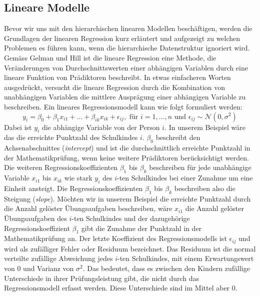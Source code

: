 \documentclass[12pt]{article}\usepackage[]{graphicx}\usepackage[]{color}
\numberwithin{equation}{section}
\begin{document}
\subsection{Lineare Modelle} \label{section:linear_model}
Bevor wir uns mit den hierarchischen linearen Modellen beschäftigen, werden die Grundlagen der linearen Regression kurz erläutert und aufgezeigt zu welchen Problemen es führen kann, wenn die hierarchische Datenstruktur ignoriert wird. Gemäss Gelman und Hill \citeyearpar{andrew_data} ist die lineare Regression eine Methode, die Veränderungen von Durchschnittswerten einer abhängigen Variablen durch eine lineare Funktion von Prädiktoren beschreibt. In etwas einfacheren Worten ausgedrückt, versucht die lineare Regression durch die Kombination von unabhängigen Variablen die mittlere Ausprägung einer abhängigen Variable zu beschreiben. Ein lineares Regressionsmodell kann wie folgt formuliert werden:
\begin{equation} \label{eq:ols_model}
y_{i} = \beta_{0} + \beta_{1}x_{i1} + \dots + \beta_{ik}x_{ik} + \epsilon_{ij}, \text{ für } i = 1, \dots, n \text{ und } \epsilon_{ij} \sim \mathcal{N}(0,\sigma^{2})
\end{equation}
Dabei ist $y_{i}$ die abhängige Variable von der Person $i$. In unserem Beispiel wäre das die erreichte Punktzahl des Schulkindes $i$. $\beta_0$ beschreibt den Achsenabschnittes (\textit{intercept}) und ist die durchschnittlich erreichte Punktzahl in der Mathematikprüfung, wenn keine weitere Prädiktoren berücksichtigt werden. Die weiteren Regressionskoeffizienten $\beta_{1}$ bis $\beta_{k}$ beschreiben für jede unabhängige Variable $x_{i1}$ bis $x_{ik}$ wie stark $y_{i}$ des $i$-ten Schulkindes bei einer Zunahme um eine Einheit ansteigt. Die Regressionskoeffizienten $\beta_{1}$ bis $\beta_{k}$ beschreiben also die Steigung (\textit{slope}). Möchten wir in unserem Beispiel die erreichte Punktzahl durch die Anzahl gelöster Übungsaufgaben beschreiben, wäre $x_{i1}$ die Anzahl gelöster Übungsaufgaben des $i$-ten Schulkindes und der dazugehörige Regressionskoeffizient $\beta_{1}$ gibt die Zunahme der Punktzahl in der Mathematikprüfung an. Der letzte Koeffizient des Regressionsmodells ist $\epsilon_{ij}$ und wird als zufälliger Fehler oder Residuum bezeichnet. Das Residuum ist die normal verteilte zufällige Abweichung jedes $i$-ten Schulkindes, mit einem Erwartungswert von 0 und Varianz von $\sigma^{2}$. Das bedeutet, dass es zwischen den Kindern zufällige Unterschiede in ihrer Prüfungsleistung gibt, die nicht durch das Regressionsmodell erfasst werden. Diese Unterschiede sind im Mittel aber 0. 
\end{document}
